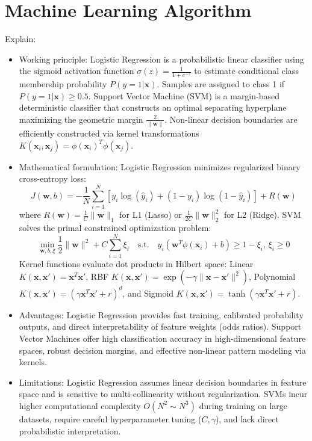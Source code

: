 \documentclass[12pt,a4paper]{article}
\begin{document}
\section{Machine Learning Algorithm}
Explain:
\begin{itemize}
\item Working principle: Logistic Regression is a probabilistic linear classifier using the sigmoid activation function $\sigma(z) = \frac{1}{1 + e^{-z}}$ to estimate conditional class membership probability $P(y=1|\mathbf{x})$. Samples are assigned to class 1 if $P(y=1|\mathbf{x}) \ge 0.5$. Support Vector Machine (SVM) is a margin-based deterministic classifier that constructs an optimal separating hyperplane maximizing the geometric margin $\frac{2}{\|\mathbf{w}\|}$. Non-linear decision boundaries are efficiently constructed via kernel transformations $K(\mathbf{x}_i, \mathbf{x}_j) = \phi(\mathbf{x}_i)^T \phi(\mathbf{x}_j)$.
\item Mathematical formulation: Logistic Regression minimizes regularized binary cross-entropy loss:
\begin{equation}
J(\mathbf{w}, b) = -\frac{1}{N} \sum_{i=1}^N \left[ y_i \log(\hat{y}_i) + (1-y_i)\log(1-\hat{y}_i) \right] + R(\mathbf{w})
\end{equation}
where $R(\mathbf{w}) = \frac{1}{C}\|\mathbf{w}\|_1$ for L1 (Lasso) or $\frac{1}{2C}\|\mathbf{w}\|_2^2$ for L2 (Ridge).
SVM solves the primal constrained optimization problem:
\begin{equation}
\min_{\mathbf{w},b,\xi} \frac{1}{2}\|\mathbf{w}\|^2 + C\sum_{i=1}^N \xi_i \quad \text{s.t.} \quad y_i(\mathbf{w}^T \phi(\mathbf{x}_i) + b) \ge 1 - \xi_i, \, \xi_i \ge 0
\end{equation}
Kernel functions evaluate dot products in Hilbert space: Linear $K(\mathbf{x},\mathbf{x}') = \mathbf{x}^T\mathbf{x}'$, RBF $K(\mathbf{x},\mathbf{x}') = \exp(-\gamma \|\mathbf{x}-\mathbf{x}'\|^2)$, Polynomial $K(\mathbf{x},\mathbf{x}') = (\gamma \mathbf{x}^T\mathbf{x}'+r)^d$, and Sigmoid $K(\mathbf{x},\mathbf{x}') = \tanh(\gamma \mathbf{x}^T\mathbf{x}'+r)$.
\item Advantages: Logistic Regression provides fast training, calibrated probability outputs, and direct interpretability of feature weights (odds ratios). Support Vector Machines offer high classification accuracy in high-dimensional feature spaces, robust decision margins, and effective non-linear pattern modeling via kernels.
\item Limitations: Logistic Regression assumes linear decision boundaries in feature space and is sensitive to multi-collinearity without regularization. SVMs incur higher computational complexity $O(N^2 \sim N^3)$ during training on large datasets, require careful hyperparameter tuning ($C, \gamma$), and lack direct probabilistic interpretation.
\end{itemize}
\end{document}
